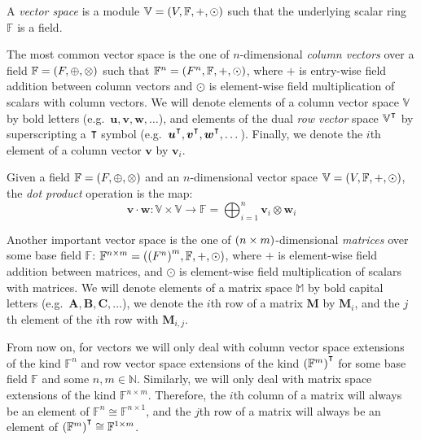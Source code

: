 \begin{definition}
  A \emph{vector space} is a module \(\mathbb{V} = \Tuple{V, \mathbb{F}, +, \odot}\) such that the 
  underlying scalar ring \(\mathbb{F}\) is a field.
\end{definition} 

The most common vector space is the one of \(n\)-dimensional \emph{column vectors} over a 
field \(\mathbb{F} = \Tuple{F, \oplus, \otimes}\) such that \(\mathbb{F}^n = 
\Tuple{F^n, \mathbb{F}, +, \odot}\), where \(+\) is entry-wise field addition between 
column vectors and \(\odot \) is element-wise field multiplication of scalars with column vectors.
We will denote elements of a column vector space \(\mathbb{V}\) by bold letters 
(e.g.\  \(\bm{u}, \bm{v}, \bm{w}, \dots \)), and elements of the dual \emph{row vector} space 
\(\mathbb{V}^{\transpose}\) by superscripting a \(\transpose \) symbol
(e.g.\  \(\bm{u}^{\transpose}, \bm{v}^{\transpose}, \bm{w}^{\transpose}, \dots \)). 
Finally, we denote the \(i\)th element of a column vector \(\bm{v}\) by \(\bm{v}_i\).
\begin{definition}
  Given a field \(\mathbb{F} = \Tuple{F, \oplus, \otimes}\) and an \(n\)-dimensional vector space 
  \(\mathbb{V} = \Tuple{V, \mathbb{F}, +, \odot}\), the \emph{dot product} operation is the map:
  \[
    \bm{v} \cdot \bm{w}\colon \mathbb{V} \times \mathbb{V} \to \mathbb{F} = 
    \bigoplus_{i = 1}^{n}{\bm{v}_i \otimes \bm{w}_i}
  \]
\end{definition}

Another important vector space is the one of \(\Parens*{n \times m}\)-dimensional \emph{matrices} 
over some base field \(\mathbb{F}\): 
\(\mathbb{F}^{n \times m} = \Tuple{{\Parens*{F^n}}^m, \mathbb{F}, +, \odot}\), where \(+\) is 
element-wise field addition between matrices, and \(\odot \) is element-wise field multiplication 
of scalars with matrices.
We will denote elements of a matrix space \(\mathbb{M}\) by bold capital letters 
(e.g.\  \(\bm{A}, \bm{B}, \bm{C}, \dots \)), we denote the \(i\)th row of a matrix \(\bm{M}\) by 
\(\bm{M}_{i}\), 
and the \(j\)th element of the \(i\)th row with \(\bm{M}_{i,j}\).

From now on, for vectors we will only deal with column vector space extensions of the kind 
\(\mathbb{F}^n\) and row vector space extensions of the kind 
\(\Parens*{\mathbb{F}^m}^{\transpose}\) for some base field \(\mathbb{F}\) and some 
\(n, m \in \mathbb{N}\).
Similarly, we will only deal with matrix space extensions of the kind \(\mathbb{F}^{n \times m}\).
Therefore, the \(i\)th column of a matrix will always be an element of 
\(\mathbb{F}^{n} \cong \mathbb{F}^{n \times 1}\), and the \(j\)th row of a matrix will always be an
element of \(\Parens*{\mathbb{F}^m}^{\transpose} \cong \mathbb{F}^{1 \times m}\).

